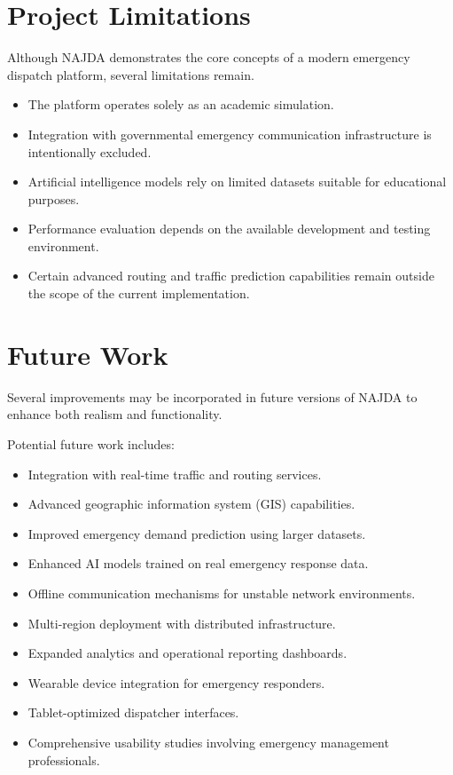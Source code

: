 
\section{Project Limitations}

Although NAJDA demonstrates the core concepts of a modern emergency dispatch platform, several limitations remain.

\begin{itemize}
    \item The platform operates solely as an academic simulation.
    \item Integration with governmental emergency communication infrastructure is intentionally excluded.
    \item Artificial intelligence models rely on limited datasets suitable for educational purposes.
    \item Performance evaluation depends on the available development and testing environment.
    \item Certain advanced routing and traffic prediction capabilities remain outside the scope of the current implementation.
\end{itemize}


\section{Future Work}

Several improvements may be incorporated in future versions of NAJDA to enhance both realism and functionality.

Potential future work includes:

\begin{itemize}
    \item Integration with real-time traffic and routing services.
    \item Advanced geographic information system (GIS) capabilities.
    \item Improved emergency demand prediction using larger datasets.
    \item Enhanced AI models trained on real emergency response data.
    \item Offline communication mechanisms for unstable network environments.
    \item Multi-region deployment with distributed infrastructure.
    \item Expanded analytics and operational reporting dashboards.
    \item Wearable device integration for emergency responders.
    \item Tablet-optimized dispatcher interfaces.
    \item Comprehensive usability studies involving emergency management professionals.
\end{itemize}

